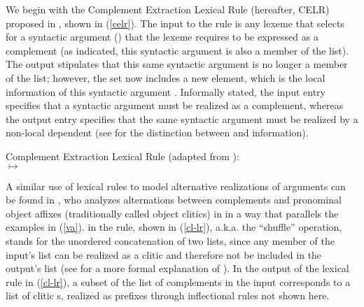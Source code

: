 \documentclass[output=paper
 	        ,biblatex
                ,babelshorthands
                ,newtxmath
                ,draftmode
                ,colorlinks, citecolor=brown
]{langscibook}
\begin{document}
We begin with the Complement Extraction Lexical Rule (hereafter, CELR) proposed in , shown in (\ref{celr}). The input to the rule is any lexeme that selects for a syntactic argument () that the lexeme requires to be expressed as a complement (as indicated, this syntactic argument is also a member of the  list). The output stipulates that this same syntactic argument is no longer a member of the  list; however, the  set now includes a new element, which is the local information of this syntactic argument . Informally stated, the input entry specifies that a syntactic argument must be realized as a complement, whereas the output entry specifies that the same syntactic argument must be realized by a non-local dependent (see \citealt[Chapter~4]{PollardandSag1994} for the distinction between  and  information).

\ea
Complement Extraction Lexical Rule (adapted from \citealt[]{PollardandSag1994}):\\
\label{celr}
	$\mapsto$
\z


A similar use of lexical rules to model alternative realizations of arguments can be found in , who analyzes alternations between complements and pronominal object affixes (traditionally called object clitics) in  in a way that parallels the  examples in (\ref{va}). \shuffle\is{$\bigcirc$} in the rule, shown in (\ref{cl-lr}), a.k.a. the ``shuffle'' operation, stands for the unordered concatenation of two lists, since any member of the input's  list can be realized as a clitic and therefore not be included in the output's  list (see \crossrefchaptert[\pageref{rel-shuffle}]{order} for a more formal explanation of \shuffle). In the output of the lexical rule in (\ref{cl-lr}), a subset of the list of complements in the input  corresponds to a list of clitic s, realized as prefixes through inflectional rules not shown here. 
\end{document}
